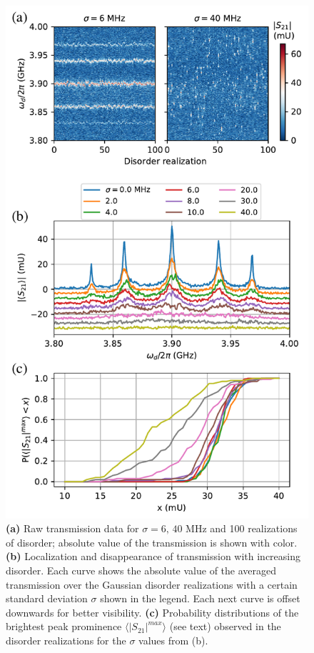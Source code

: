 \documentclass[%
 aps, prl,
 amsmath,amssymb,
 reprint,%
superscriptaddress
]{revtex4-2}
\begin{document}
\begin{figure}
	\includegraphics[width=1\linewidth]{mbl}
	\caption{\textbf{(a)} Raw transmission data for $\sigma = 6,\, 40$ MHz and 100 realizations of disorder; absolute value of the transmission is shown with color. \textbf{(b)} Localization and disappearance of transmission with increasing disorder. Each curve shows the absolute value of the averaged transmission over the Gaussian disorder realizations with a certain standard deviation $\sigma$ shown in the legend. Each next curve is offset downwards for better visibility. \textbf{(c)} Probability distributions of the brightest peak prominence $\langle |S_{21}|^{max}\rangle$ (see text) observed in the disorder realizations for the $\sigma$ values from (b).}
	\label{fig:mbl}
\end{figure}
\end{document}
